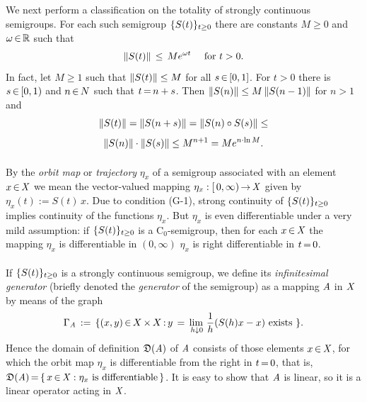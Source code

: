 \documentclass[11pt,twoside]{article}
\begin{document}
\subparagraph*{} %
We next perform a classification on the totality of strongly
continuous semigroups.
For each such semigroup $\{{S}(t)\}_{t \geq 0}$
there are constants $M \geq 0$ and $\omega {\,\in\,} {\mathbb{R}}$
such that
\begin{equation}\label{SEMIGROUP_GROWTH}
\left\lVert {S}(t) \right\rVert \, \leq \, M e^{\omega t}
\quad \mbox{ for } t > 0.
\end{equation}
In fact,
let $M \geq 1$ such that $\left\lVert S(t) \right\rVert \leq M$ for all $s {\,\in\,} [0,1]$.
For $t > 0$ there is $s {\,\in\,} [0,1)$ and $n {\,\in\,} N$ such that $t {\,=\,} n+s$.
Then $\left\lVert {S}(n) \right\rVert\leq M \left\lVert S(n-1) \right\rVert$ for $n > 1$ and
\[
\left\lVert {S}(t) \right\rVert = \left\lVert {S}(n+s) \right\rVert = \left\lVert {S}(n) \circ {S}(s) \right\rVert \leq
\]
\[
\left\lVert {S}(n) \right\rVert \cdot \left\lVert {S}(s) \right\rVert \leq M^{n+1} = M e^{n \cdot \ln{M}}.
\]

\paragraph*{} %
By the \textit{orbit map} or \textit{trajectory} $\eta_x$ of a semigroup
associated with an element $x {\,\in\,} \mathit{X}$
we mean the vector-valued mapping $\eta_x:[\,0,\infty) {\,\to\,} \mathit{X}$
given by $\eta_x(t) := S(t) \, x$.
Due to condition (G-1),
strong continuity of $\{{S}(t)\}_{t \geq 0}$
implies continuity of the functions $\eta_x$.
But $\eta_x$ is even differentiable under a very mild assumption:
if $\{{S}(t)\}_{t \geq 0}$ is a C$_0$-semigroup,
then for each $x {\,\in\,} \mathit{X}$
the mapping $\eta_x$ is differentiable in $(0,\infty)$
\iff
$\eta_x$ is right differentiable in $t {\,=\,} 0$.

\paragraph*{} %
If $\{{S}(t)\}_{t \geq 0}$ is a strongly continuous semigroup,
we define its \textit{infinitesimal generator}
(briefly denoted the \textit{generator} of the semigroup)
as a mapping $\mathit{A}$ in $\mathit{X}$ by means of the graph
\[
\Gamma_{\mathit{A}} \,:=\,
\{(x,y) {\,\in\,} X {\,\times\,} X {\,:\,}
y \,=\, \lim_{\,h \downarrow 0} \, \frac{1}{h}({S}(h)x-x) \mbox{ exists } \}.
\]
Hence the domain of definition $\mathfrak{D}(\mathit{A})$ of $\mathit{A}$
consists of those elements $x {\,\in\,} \mathit{X}$,
for which the orbit map $\eta_x$ is differentiable from the right in $t {\,=\,} 0$,
that is,
$\mathfrak{D}(\mathit{A}) {\,=\,} \{\,x {\,\in\,} \mathit{X}: \eta_x \mbox{ is differentiable}\,\}$.
It is easy to show that
$\mathit{A}$ is linear,
so it is a linear operator acting in $\mathit{X}$.
\end{document}
